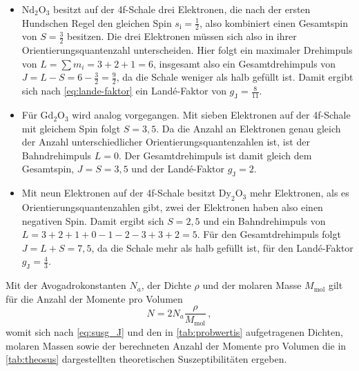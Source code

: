 \begin{itemize}
    \item $\text{Nd}_2 \text{O}_3$ besitzt auf der 4f-Schale drei Elektronen, die nach der ersten Hundschen Regel den gleichen Spin $s_\text{i} = \frac{1}{2}$, also kombiniert einen Gesamtspin von $S = \frac{3}{2}$ besitzen.
          Die drei Elektronen müssen sich also in ihrer Orientierungsquantenzahl unterscheiden. 
          Hier folgt ein maximaler Drehimpuls von $L = \sum m_i = 3 + 2 + 1 = 6$, insgesamt also ein Gesamtdrehimpuls von $J = L - S = 6 - \frac{3}{2} = \frac{9}{2}$,
          da die Schale weniger als halb gefüllt ist.
          Damit ergibt sich nach \eqref{eq:lande-faktor} ein Landé-Faktor von $g_\text{J} = \frac{8}{11}$.

    \item Für $\text{Gd}_2\text{O}_3$ wird analog vorgegangen. Mit sieben Elektronen auf der 4f-Schale mit gleichem Spin folgt $S = 3,5$. 
        Da die Anzahl an Elektronen genau gleich der Anzahl unterschiedlicher Orientierungsquantenzahlen ist, ist der Bahndrehimpuls $L = 0$.
        Der Gesamtdrehimpuls ist damit gleich dem Gesamtspin, $J = S = 3,5$ und der Landé-Faktor $g_\text{J} = 2$.

    \item Mit neun Elektronen auf der 4f-Schale besitzt $\text{Dy}_2\text{O}_3$ mehr Elektronen, als es Orientierungsquantenzahlen gibt, zwei der Elektronen haben also einen negativen Spin.
        Damit ergibt sich $S = 2,5$ und ein Bahndrehimpuls von \\ $L = 3 + 2 + 1 + 0 - 1 - 2 - 3 + 3 + 2 = 5$.
        Für den Gesamtdrehimpuls folgt $J = L + S = 7,5$, da die Schale mehr als halb gefüllt ist, für den Landé-Faktor $g_\text{J} = \frac{4}{3}$.
\end{itemize}

Mit der Avogadrokonstanten $N_a$, der Dichte $\rho$ und der molaren Masse $M_\text{mol}$ gilt für die Anzahl der Momente pro Volumen
\begin{equation}
    N = 2 N_a \dfrac{\rho}{M_\text{mol}} \,,
\end{equation}
womit sich nach \eqref{eq:susg_J} und den in \autoref{tab:probwertis} aufgetragenen Dichten, molaren Massen sowie der berechneten Anzahl der Momente pro Volumen
die in \autoref{tab:theosus} dargestellten theoretischen Suszeptibilitäten ergeben.

